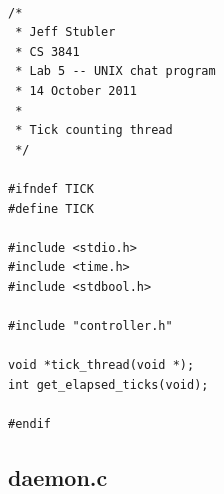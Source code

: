 \documentclass{article}
\begin{document}
\begin{verbatim}

/*
 * Jeff Stubler
 * CS 3841
 * Lab 5 -- UNIX chat program
 * 14 October 2011
 *
 * Tick counting thread
 */

#ifndef TICK
#define TICK

#include <stdio.h>
#include <time.h>
#include <stdbool.h>

#include "controller.h"

void *tick_thread(void *);
int get_elapsed_ticks(void);

#endif

\end{verbatim}

\subsection*{daemon.c}
\end{document}
